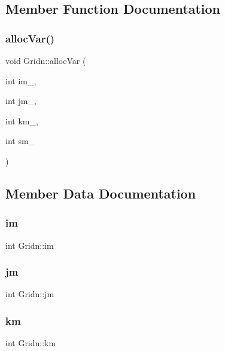 \subsection{Member Function Documentation}
\mbox{\label{classGridn_ae1ef7a5ab30431e0c539489d0565f178}} 
\subsubsection{\texorpdfstring{alloc\+Var()}{allocVar()}}
{\footnotesize\ttfamily void Gridn\+::alloc\+Var (\begin{DoxyParamCaption}\item[{int}]{im\+\_\+,  }\item[{int}]{jm\+\_\+,  }\item[{int}]{km\+\_\+,  }\item[{int}]{sm\+\_\+ }\end{DoxyParamCaption})\hspace{0.3cm}{\ttfamily [inline]}}



\subsection{Member Data Documentation}
\mbox{\label{classGridn_afd5aa77aff1bef012c5e0bc483773d43}} 
\subsubsection{\texorpdfstring{im}{im}}
{\footnotesize\ttfamily int Gridn\+::im}

\mbox{\label{classGridn_a9cb3b596b2e1476c649192bed9bedb20}} 
\subsubsection{\texorpdfstring{jm}{jm}}
{\footnotesize\ttfamily int Gridn\+::jm}

\mbox{\label{classGridn_a26254c9540eed90dc8a91b668f095895}} 
\subsubsection{\texorpdfstring{km}{km}}
{\footnotesize\ttfamily int Gridn\+::km}

